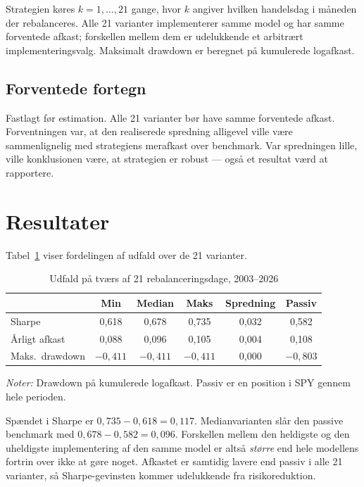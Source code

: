 \documentclass[11pt,a4paper]{article}
\begin{document}
Strategien køres $k=1,\dots,21$ gange, hvor $k$ angiver hvilken handelsdag i
måneden der rebalanceres. Alle 21 varianter implementerer samme model og har
samme forventede afkast; forskellen mellem dem er udelukkende et arbitrært
implementeringsvalg. Maksimalt drawdown er beregnet på kumulerede logafkast.

\subsection{Forventede fortegn}
Fastlagt før estimation. Alle 21 varianter bør have samme forventede afkast.
Forventningen var, at den realiserede spredning alligevel ville være
sammenlignelig med strategiens merafkast over benchmark. Var spredningen lille,
ville konklusionen være, at strategien er robust --- også et resultat værd at
rapportere.

\section{Resultater}
Tabel~\ref{tab:udfald} viser fordelingen af udfald over de 21 varianter.

\begin{table}[htbp]\centering
\caption{Udfald på tværs af 21 rebalanceringsdage, 2003--2026}
\label{tab:udfald}\small
\begin{tabularx}{0.9\textwidth}{Xccccc}
\toprule
& Min & Median & Maks & Spredning & Passiv \\
\midrule
Sharpe            & 0,618 & 0,678 & 0,735 & 0,032 & 0,582 \\
Årligt afkast     & 0,088 & 0,096 & 0,105 & 0,004 & 0,108 \\
Maks.\ drawdown   & $-0{,}411$ & $-0{,}411$ & $-0{,}411$ & 0,000 & $-0{,}803$ \\
\bottomrule
\end{tabularx}
\vspace{0.4em}
\begin{minipage}{0.9\textwidth}\footnotesize
\textit{Noter:} Drawdown på kumulerede logafkast. Passiv er en position i SPY
gennem hele perioden.
\end{minipage}
\end{table}

Spændet i Sharpe er $0{,}735-0{,}618=0{,}117$. Medianvarianten slår den passive
benchmark med $0{,}678-0{,}582=0{,}096$. Forskellen mellem den heldigste og den
uheldigste implementering af den samme model er altså \emph{større} end hele
modellens fortrin over ikke at gøre noget. Afkastet er samtidig lavere end
passiv i alle 21 varianter, så Sharpe-gevinsten kommer udelukkende fra
risikoreduktion.
\end{document}
